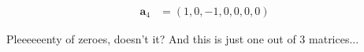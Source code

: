 \documentclass{zkdl-presentation-template}
\begin{document}
\begin{frame}
\begin{center}
\begin{minipage}{0.4\textwidth}
{\begin{align*}
            \mathbf{a}_4 &= (1, 0, -1, 0, 0, 0, 0)
        \end{align*}}
        \end{minipage}
        \begin{minipage}{0.5\textwidth}
        \end{minipage}
        \end{center}
            
        \pause
        Pleeeeeenty of zeroes, doesn't it? And this is just one out of 3 matrices...
    \end{frame}
\end{document}
